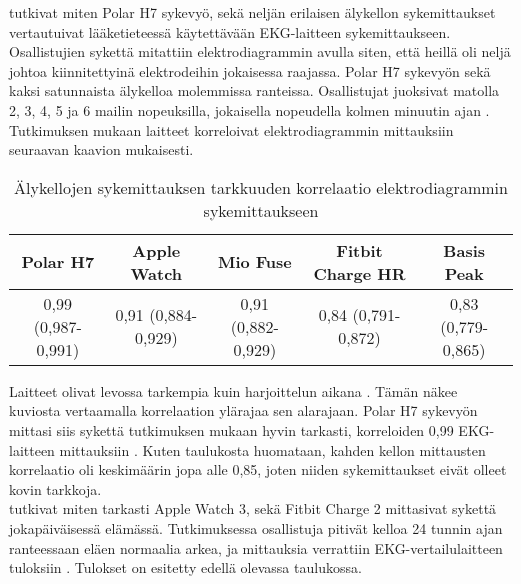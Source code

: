 \documentclass[utf8,bachelor,finnish]{bachelor}
\begin{document}
   \textcite{wang_accuracy_2017} tutkivat miten Polar H7 sykevyö, sekä neljän erilaisen älykellon sykemittaukset vertautuivat lääketieteessä käytettävään
    EKG-laitteen sykemittaukseen. Osallistujien sykettä mitattiin elektrodiagrammin avulla siten,
      että heillä oli neljä johtoa kiinnitettyinä elektrodeihin jokaisessa raajassa. Polar H7 sykevyön sekä kaksi satunnaista älykelloa molemmissa ranteissa.
       Osallistujat juoksivat matolla 2, 3, 4, 5 ja 6 mailin nopeuksilla, jokaisella nopeudella kolmen minuutin ajan \parencite{wang_accuracy_2017}.
        Tutkimuksen mukaan laitteet korreloivat elektrodiagrammin mittauksiin seuraavan kaavion mukaisesti.\\


  \begin{table}[h]
    \begin{center}
      \begin{tabular}{||c c c c c||} 
       \hline
       Polar H7 & Apple Watch & Mio Fuse & Fitbit Charge HR & Basis Peak \\ [0.5ex] 
       \hline\hline
       0,99 (0,987-0,991) & 0,91 (0,884-0,929) & 0,91 (0,882-0,929)& 0,84 (0,791-0,872)& 0,83 (0,779-0,865)\\
       \hline
      \end{tabular}
    \caption{Älykellojen sykemittauksen tarkkuuden korrelaatio elektrodiagrammin sykemittaukseen \parencite{wang_accuracy_2017}}
      \end{center}
    \end{table}

  Laitteet olivat levossa tarkempia kuin harjoittelun aikana \parencite{wang_accuracy_2017}. Tämän näkee kuviosta vertaamalla korrelaation ylärajaa sen alarajaan.
   Polar H7 sykevyön mittasi siis sykettä tutkimuksen mukaan hyvin tarkasti, korreloiden 0,99 EKG-laitteen mittauksiin \parencite{wang_accuracy_2017}.
    Kuten taulukosta huomataan, kahden kellon mittausten korrelaatio oli keskimäärin jopa alle 0,85, joten niiden sykemittaukset eivät olleet kovin tarkkoja.\\
  
  \textcite{nelson_accuracy_2019} tutkivat miten tarkasti Apple Watch 3, sekä Fitbit Charge 2 mittasivat sykettä jokapäiväisessä elämässä.
   Tutkimuksessa osallistuja pitivät kelloa 24 tunnin ajan ranteessaan eläen normaalia arkea, ja mittauksia verrattiin
    EKG-vertailulaitteen tuloksiin \parencite{nelson_accuracy_2019}. Tulokset on esitetty edellä olevassa taulukossa.\\
    
\end{document}

